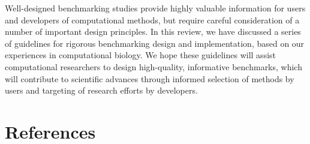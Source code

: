 Well-designed benchmarking studies provide highly valuable information for users and developers of computational methods, but require careful consideration of a number of important design principles. In this review, we have discussed a series of guidelines for rigorous benchmarking design and implementation, based on our experiences in computational biology. We hope these guidelines will assist computational researchers to design high-quality, informative benchmarks, which will contribute to scientific advances through informed selection of methods by users and targeting of research efforts by developers.


\clearpage
\section{References}
\printbibliography[heading=none]